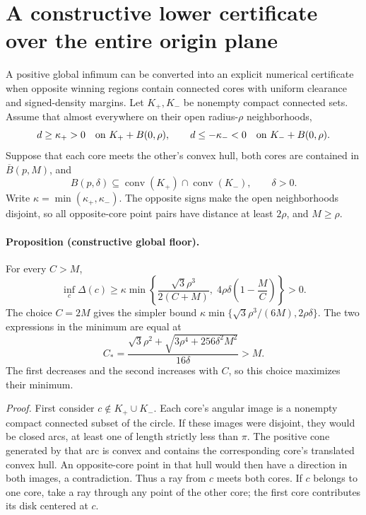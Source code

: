 \section{A constructive lower certificate over the entire origin plane}
\label{supp:constructive-global}

A positive global infimum can be converted into an explicit numerical certificate when opposite winning regions contain connected cores with uniform clearance and signed-density margins. Let $K_+,K_-$ be nonempty compact connected sets. Assume that almost everywhere on their open radius-$\rho$ neighborhoods,
\[
 d\geq\kappa_+>0\quad\hbox{on }K_++B(0,\rho),\qquad
 d\leq-\kappa_-<0\quad\hbox{on }K_-+B(0,\rho).
\]
Suppose that each core meets the other's convex hull, both cores are contained in $\overline B(p,M)$, and
\[
 B(p,\delta)\subseteq\operatorname{conv}(K_+)
                         \cap\operatorname{conv}(K_-),\qquad\delta>0.
\]
Write $\kappa=\min(\kappa_+,\kappa_-)$. The opposite signs make the open neighborhoods disjoint, so all opposite-core point pairs have distance at least $2\rho$, and $M\geq\rho$.

\paragraph{Proposition (constructive global floor).}
For every $C>M$,
\begin{equation}
 \inf_c\Delta(c)\geq\kappa\min\left\{
 \frac{\sqrt3\rho^3}{2(C+M)},\;
 4\rho\delta\left(1-\frac MC\right)\right\}>0.
 \label{supp:eq:constructive-floor}
\end{equation}
The choice $C=2M$ gives the simpler bound $\kappa\min\{\sqrt3\rho^3/(6M),2\rho\delta\}$. The two expressions in the minimum are equal at
\begin{equation}
 C_* =\frac{\sqrt3\rho^2+
             \sqrt{3\rho^4+256\delta^2M^2}}{16\delta}>M.
 \label{supp:eq:optimized-split}
\end{equation}
The first decreases and the second increases with $C$, so this choice maximizes their minimum.

\emph{Proof.}
First consider $c\notin K_+\cup K_-$. Each core's angular image is a nonempty compact connected subset of the circle. If these images were disjoint, they would be closed arcs, at least one of length strictly less than $\pi$. The positive cone generated by that arc is convex and contains the corresponding core's translated convex hull. An opposite-core point in that hull would then have a direction in both images, a contradiction. Thus a ray from $c$ meets both cores. If $c$ belongs to one core, take a ray through any point of the other core; the first core contributes its disk centered at $c$.

